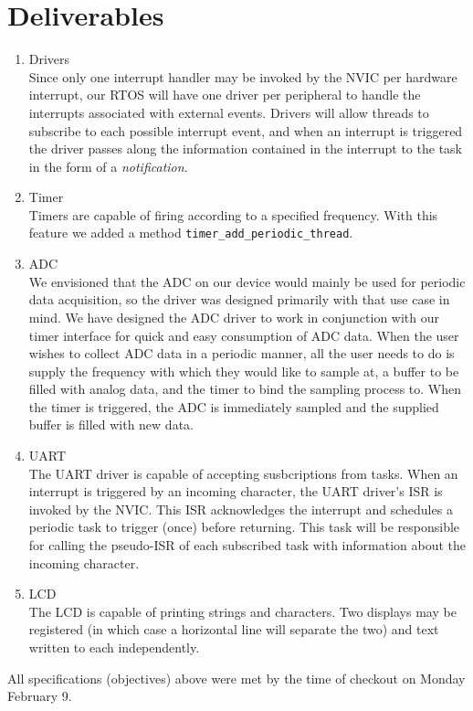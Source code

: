 \documentclass[12pt]{article}
\begin{document}
\section{Deliverables}
\begin{enumerate}
\item Drivers \\
  Since only one interrupt handler may be invoked by the NVIC per
  hardware interrupt, our RTOS will have one driver per peripheral to
  handle the interrupts associated with external events. Drivers will
  allow threads to subscribe to each possible interrupt event, and
  when an interrupt is triggered the driver passes along the
  information contained in the interrupt to the task in the form of a
  \emph{notification}.
\item Timer \\
  Timers are capable of firing according to a specified
  frequency. With this feature we added a method
  \verb|timer_add_periodic_thread|.
\item ADC \\
  We envisioned that the ADC on our device would mainly be used for
  periodic data acquisition, so the driver was designed primarily with
  that use case in mind. We have designed the ADC driver to work in
  conjunction with our timer interface for quick and easy consumption
  of ADC data. When the user wishes to collect ADC data in a periodic
  manner, all the user needs to do is supply the frequency with which
  they would like to sample at, a buffer to be filled with analog
  data, and the timer to bind the sampling process to. When the timer
  is triggered, the ADC is immediately sampled and the supplied buffer
  is filled with new data.
\item UART \\
  The UART driver is capable of accepting susbcriptions from
  tasks. When an interrupt is triggered by an incoming character, the
  UART driver's ISR is invoked by the NVIC. This ISR acknowledges the
  interrupt and schedules a periodic task to trigger (once) before
  returning. This task will be responsible for calling the pseudo-ISR
  of each subscribed task with information about the incoming
  character.
\item LCD \\
  The LCD is capable of printing strings and characters. Two displays
  may be registered (in which case a horizontal line will separate the
  two) and text written to each independently.
\end{enumerate}
All specifications (objectives) above were met by the time of checkout
on Monday February 9.
\end{document}
